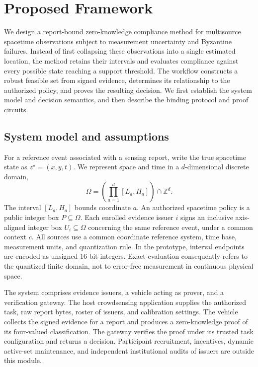 \section{Proposed Framework}
We design a report-bound zero-knowledge compliance method for multisource spacetime observations subject to measurement uncertainty and Byzantine failures. Instead of first collapsing these observations into a single estimated location, the method retains their intervals and evaluates compliance against every possible state reaching a support threshold. The workflow constructs a robust feasible set from signed evidence, determines its relationship to the authorized policy, and proves the resulting decision. We first establish the system model and decision semantics, and then describe the binding protocol and proof circuits.

\subsection{System model and assumptions}
For a reference event associated with a sensing report, write the true spacetime state as $z^\star=(x,y,t)$. We represent space and time in a $d$-dimensional discrete domain,
\begin{equation}\label{eq:domain}
\Omega=\left(\prod_{a=1}^{d}[L_a,H_a]\right)\cap\mathbb Z^d.
\end{equation}
The interval $[L_a,H_a]$ bounds coordinate $a$. An authorized spacetime policy is a public integer box $P\subseteq\Omega$. Each enrolled evidence issuer $i$ signs an inclusive axis-aligned integer box $U_i\subseteq\Omega$ concerning the same reference event, under a common context $c$. All sources use a common coordinate reference system, time base, measurement units, and quantization rule. In the prototype, interval endpoints are encoded as unsigned 16-bit integers. Exact evaluation consequently refers to the quantized finite domain, not to error-free measurement in continuous physical space.

The system comprises evidence issuers, a vehicle acting as prover, and a verification gateway. The host crowdsensing application supplies the authorized task, raw report bytes, roster of issuers, and calibration settings. The vehicle collects the signed evidence for a report and produces a zero-knowledge proof of its four-valued classification. The gateway verifies the proof under its trusted task configuration and returns a decision. Participant recruitment, incentives, dynamic active-set maintenance, and independent institutional audits of issuers are outside this module.

